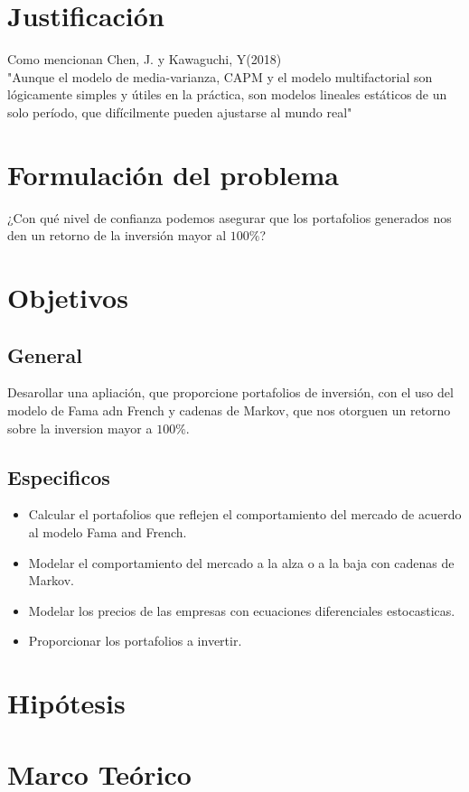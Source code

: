 \documentclass[12pt,a4paper]{article}
\begin{document}
		\section{Justificación}
		Como mencionan   Chen, J. y Kawaguchi, Y(2018)\\
   "Aunque el modelo de media-varianza, CAPM y el modelo multifactorial son lógicamente simples y útiles en la práctica, son modelos lineales estáticos de un solo período, que difícilmente pueden ajustarse al mundo real"
		\section{Formulación del problema}	
		¿Con qué nivel de confianza podemos asegurar que los portafolios generados nos den un retorno de la inversión mayor al $100\%$?
		\section{Objetivos}
			\subsection{General}
			Desarollar una apliación, que proporcione portafolios de inversión, con el uso del modelo de Fama adn French y cadenas de Markov, que nos otorguen un retorno sobre la  inversion mayor a $100\%$.
			\subsection{Especificos}
			\begin{itemize}
			\item Calcular el portafolios que reflejen el comportamiento del mercado de acuerdo al modelo Fama and French. 
			\item Modelar el comportamiento del mercado a la alza o  a la baja con cadenas de Markov.
			\item Modelar los precios de las empresas con ecuaciones diferenciales estocasticas.
			\item Proporcionar los  portafolios a invertir.
			\end{itemize}
		\section{Hipótesis}
		\section{Marco Teórico}
\end{document}
